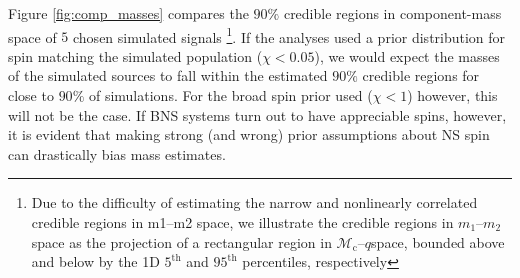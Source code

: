 Figure \ref{fig:comp_masses} compares the $90\%$ credible regions in component-mass space of $5$ chosen simulated signals \citep[cf.][figure 1]{Chatziioannou_2014}\footnote{Due to the difficulty of estimating the narrow and nonlinearly correlated credible regions in m1–m2 space, we illustrate the credible regions in $m_1$--$m_2$ space as the projection of a rectangular region in $\mathcal{M}_\mathrm{c}$--$q$space, bounded above and below by the 1D $5^\mathrm{th}$ and $95^\mathrm{th}$ percentiles, respectively}. If the analyses used a prior distribution for spin matching the simulated population ($\chi < 0.05$), we would expect the masses of the simulated sources to fall within the estimated $90\%$ credible regions for close to $90\%$ of simulations. For the broad spin prior used ($\chi < 1$) however, this will not be the case.  If BNS systems turn out to have appreciable spins, however, it is evident that making strong (and wrong) prior assumptions about NS spin can drastically bias mass estimates.
  
  